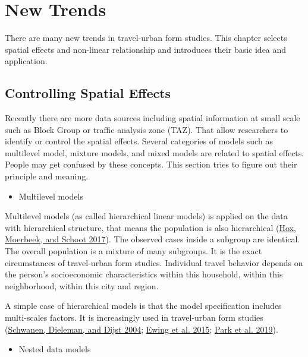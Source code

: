 \documentclass[
  11pt,
  openany]{memoir}
\providecommand{\tightlist}{%
  \setlength{\itemsep}{0pt}\setlength{\parskip}{0pt}}
\begin{document}
\hypertarget{new-trends}{%
\chapter{New Trends}\label{new-trends}}

There are many new trends in travel-urban form studies. This chapter selects spatial effects and non-linear relationship and introduces their basic idea and application.

\hypertarget{controlling-spatial-effects}{%
\section{Controlling Spatial Effects}\label{controlling-spatial-effects}}

Recently there are more data sources including spatial information at small scale such as Block Group or traffic analysis zone (TAZ).
That allow researchers to identify or control the spatial effects.
Several categories of models such as multilevel model, mixture models, and mixed models are related to spatial effects. People may get confused by these concepts. This section tries to figure out their principle and meaning.

\begin{itemize}
\tightlist
\item
  Multilevel models
\end{itemize}

Multilevel models (as called hierarchical linear models) is applied on the data with hierarchical structure, that means the population is also hierarchical (\protect\hyperlink{ref-hoxMultilevelAnalysisTechniques2017}{Hox, Moerbeek, and Schoot 2017}).
The observed cases inside a subgroup are identical. The overall population is a mixture of many subgroups.
It is the exact circumstances of travel-urban form studies. Individual travel behavior depends on the person's socioeconomic characteristics within this household, within this neighborhood, within this city and region.

A simple case of hierarchical models is that the model specification includes multi-scales factors.
It is increasingly used in travel-urban form studies (\protect\hyperlink{ref-schwanenImpactMetropolitanStructure2004}{Schwanen, Dieleman, and Dijst 2004}; \protect\hyperlink{ref-ewingVaryingInfluencesBuilt2015}{Ewing et al. 2015}; \protect\hyperlink{ref-parkNotParkingLots2019}{Park et al. 2019}).

\begin{itemize}
\tightlist
\item
  Nested data models
\end{itemize}
\end{document}
